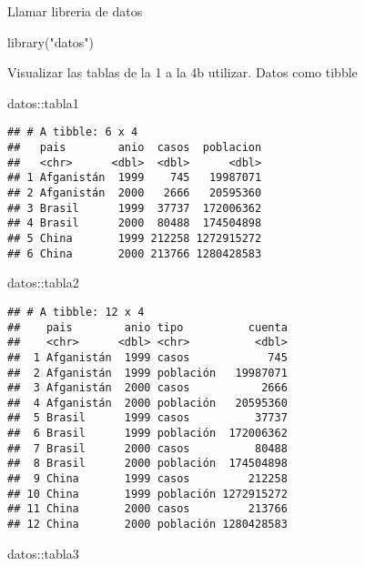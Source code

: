 \documentclass[
]{article}
\newenvironment{Shaded}{\begin{snugshade}}{\end{snugshade}}
\newcommand{\FunctionTok}[1]{\textcolor[rgb]{0.00,0.00,0.00}{#1}}
\newcommand{\NormalTok}[1]{#1}
\newcommand{\SpecialCharTok}[1]{\textcolor[rgb]{0.00,0.00,0.00}{#1}}
\newcommand{\StringTok}[1]{\textcolor[rgb]{0.31,0.60,0.02}{#1}}
\begin{document}
Llamar libreria de datos

\begin{Shaded}
\begin{Highlighting}[]
\FunctionTok{library}\NormalTok{(}\StringTok{"datos"}\NormalTok{)}
\end{Highlighting}
\end{Shaded}

Visualizar las tablas de la 1 a la 4b utilizar. Datos como tibble

\begin{Shaded}
\begin{Highlighting}[]
\NormalTok{datos}\SpecialCharTok{::}\NormalTok{tabla1}
\end{Highlighting}
\end{Shaded}

\begin{verbatim}
## # A tibble: 6 x 4
##   pais        anio  casos  poblacion
##   <chr>      <dbl>  <dbl>      <dbl>
## 1 Afganistán  1999    745   19987071
## 2 Afganistán  2000   2666   20595360
## 3 Brasil      1999  37737  172006362
## 4 Brasil      2000  80488  174504898
## 5 China       1999 212258 1272915272
## 6 China       2000 213766 1280428583
\end{verbatim}

\begin{Shaded}
\begin{Highlighting}[]
\NormalTok{datos}\SpecialCharTok{::}\NormalTok{tabla2}
\end{Highlighting}
\end{Shaded}

\begin{verbatim}
## # A tibble: 12 x 4
##    pais        anio tipo          cuenta
##    <chr>      <dbl> <chr>          <dbl>
##  1 Afganistán  1999 casos            745
##  2 Afganistán  1999 población   19987071
##  3 Afganistán  2000 casos           2666
##  4 Afganistán  2000 población   20595360
##  5 Brasil      1999 casos          37737
##  6 Brasil      1999 población  172006362
##  7 Brasil      2000 casos          80488
##  8 Brasil      2000 población  174504898
##  9 China       1999 casos         212258
## 10 China       1999 población 1272915272
## 11 China       2000 casos         213766
## 12 China       2000 población 1280428583
\end{verbatim}

\begin{Shaded}
\begin{Highlighting}[]
\NormalTok{datos}\SpecialCharTok{::}\NormalTok{tabla3}
\end{Highlighting}
\end{Shaded}
\end{document}
